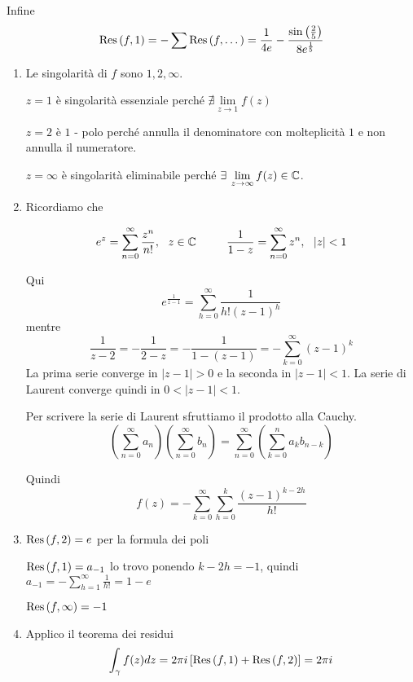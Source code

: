 Infine
\begin{equation*}
\operatorname{Res} \left(f, 1\right) = - \sum \operatorname{Res} \left(f, \dotsc \right) = \frac{1}{4e} - \frac{\sin\left(\frac{2}{5}\right)}{8e^{\frac{1}{5}}}
\end{equation*}
\Soluzione
\begin{enumerate}
\item Le singolarità di $f$ sono $1, 2, \infty $.

$z = 1$ è singolarità essenziale perché $\nexists \lim\limits_{z\rightarrow 1} f(z)$

$z = 2$ è $1$ - polo perché annulla il denominatore con molteplicità $1$ e non annulla il numeratore.

$z = \infty $ è singolarità eliminabile perché $\exists \lim\limits_{z\rightarrow \infty} f(z) \in \CC $.
\item Ricordiamo che

\begin{rem}
\begin{equation*}
e^{z} = \sum\limits^{\infty}_{n = 0}\frac{z^{n}}{n!}, \ \ z\in \mathbb{C}  \ \ \ \ \ \ \ \ \frac{1}{1 - z} = \sum\limits^{\infty}_{n = 0} z^{n}, \ \ \left| z\right| < 1
\end{equation*}
\end{rem}

Qui
\begin{equation*}
e^{\frac{1}{z - 1}} = \sum\limits^{\infty}_{h = 0}\frac{1}{h!\left(z - 1\right)^{h}}
\end{equation*}mentre
\begin{equation*}
\frac{1}{z - 2} = - \frac{1}{2 - z} = - \frac{1}{1 - \left(z - 1\right)} = - \sum\limits^{\infty}_{k = 0}\left(z - 1\right)^{k}
\end{equation*}La prima serie converge in $\left| z - 1\right|  > 0$ e la seconda in $\left| z - 1\right| < 1$. La serie di Laurent converge quindi in $0 < \left| z - 1\right| < 1$.
\begin{rem}
Per scrivere la serie di Laurent sfruttiamo il prodotto alla Cauchy.
\begin{equation*}
\left(\sum\limits^{\infty}_{n = 0} a_{n}\right)\left(\sum\limits^{\infty}_{n = 0} b_{n}\right) = \sum\limits^{\infty}_{n = 0}\left(\sum\limits^{n}_{k = 0} a_{k} b_{n - k}\right)
\end{equation*}
\end{rem}Quindi
\begin{equation*}
f(z) = - \sum\limits^{\infty}_{k = 0}\sum\limits^{k}_{h = 0}\frac{\left(z - 1\right)^{k - 2h}}{h!}
\end{equation*}
\item $\operatorname{Res} \left(f, 2\right) = e$ per la formula dei poli

$\operatorname{Res} \left(f, 1\right) = a_{- 1}$ lo trovo ponendo $k - 2h = -1$, quindi $a_{- 1} = - \sum\limits^{\infty}_{h = 1}\frac{1}{h!} = 1 - e$

$\operatorname{Res} \left(f, \infty \right) = - 1$
\item Applico il teorema dei residui
\begin{equation*}
\int\nolimits_{\gamma} f(z) dz = 2\pi i\left[\operatorname{Res} \left(f, 1\right) + \operatorname{Res} \left(f, 2\right)\right] = 2\pi i
\end{equation*}
\end{enumerate}
